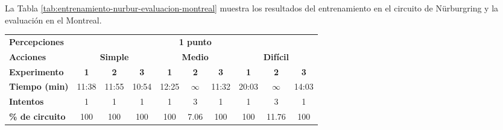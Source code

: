 La Tabla \ref{tab:entrenamiento-nurbur-evaluacion-montreal} muestra los resultados del entrenamiento en el circuito de Nürburgring y la evaluación en el Montreal.

\begin{table}[ht!]
\centering
\begin{tabular}{|l|c|c|c|c|c|c|c|c|c|}
\hline
\rowcolor[HTML]{EFEFEF} 
\multicolumn{10}{|c|}{\cellcolor[HTML]{EFEFEF}\textbf{Entrenamiento en Nürburgring y ejecución en Montreal}}                                                                                                                                                            \\ \hline
\rowcolor[HTML]{EFEFEF} 
\textbf{Percepciones}                           & \multicolumn{9}{c|}{\cellcolor[HTML]{EFEFEF}\textbf{1 punto}}                                                                                                                                                         \\ \hline
\rowcolor[HTML]{EFEFEF} 
\textbf{Acciones}                               & \multicolumn{3}{c|}{\cellcolor[HTML]{EFEFEF}\textbf{Simple}} & \multicolumn{3}{c|}{\cellcolor[HTML]{EFEFEF}\textbf{Medio}}               & \multicolumn{3}{c|}{\cellcolor[HTML]{EFEFEF}\textbf{Difícil}}              \\ \hline
\rowcolor[HTML]{EFEFEF} 
\textbf{Experimento}                            & \textbf{1}                      & \textbf{2}   & \textbf{3}  & \textbf{1}                    & \textbf{2}                   & \textbf{3} & \textbf{1}                    & \textbf{2}                    & \textbf{3} \\ \hline
\rowcolor[HTML]{FFFFFF} 
\cellcolor[HTML]{EFEFEF}\textbf{Tiempo (min)}   & 11:38                           & 11:55        & \cellcolor[HTML]{32CB00}10:54       & 12:25                         & $\infty$                      & 11:32      & 20:03                         & $\infty$                       & 14:03      \\ \hline
\rowcolor[HTML]{FFFFFF} 
\cellcolor[HTML]{EFEFEF}\textbf{Intentos}       & 1                               & 1            & 1           & 1                             & 3                            & 1          & 1                             & 3                             & 1          \\ \hline
\rowcolor[HTML]{32CB00} 
\cellcolor[HTML]{EFEFEF}\textbf{\% de circuito} & 100                             & 100          & 100         & 100                           & \cellcolor[HTML]{FFC702}7.06 & 100        & 100                           & \cellcolor[HTML]{FFC702}11.76 & 100        \\ \hline

\end{tabular}
\end{table}
